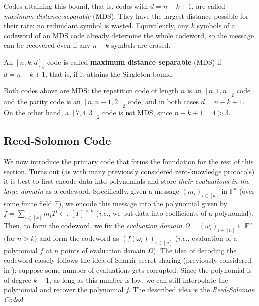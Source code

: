 \documentclass[../../book]{subfiles}
\begin{document}
Codes attaining this bound, that is, codes with $d = n-k+1$, are called \emph{maximum distance separable} (MDS).
They have the largest distance possible for their rate: no redundant symbol is wasted.
Equivalently, any $k$ symbols of a codeword of an MDS code already determine the whole codeword, so the message can be recovered even if any $n-k$ symbols are erased.

\begin{definition}\label{def:mds}
  An $[n,k,d]_q$ code is called \textbf{maximum distance separable} (MDS) if $d = n-k+1$, that is, if it attains the Singleton bound.
\end{definition}

\begin{example}
  Both codes above are MDS: the repetition code of length $n$ is an $[n,1,n]_2$ code and the parity code is an $[n,n-1,2]_2$ code, and in both cases $d = n-k+1$. On the other hand, a $[7,4,3]_2$ code is not MDS, since $n-k+1 = 4 > 3$.
\end{example}

\subsection{Reed-Solomon Code}

We now introduce the primary code that forms the foundation for the rest of this section.
Turns out (as with many previously considered zero-knowledge protocols) it is best to first encode data into polynomials and store \emph{their evaluations in the large domain} as a codeword.
Specifically, given a message $(m_i)_{i \in [k]}$ in $\mathbb{F}^k$ (over some finite field $\mathbb{F}$), we encode this message into the polynomial given by $f = \sum_{i \in [k]}m_iT^i \in \mathbb{F}[T]^{<k}$ (\emph{i.e.}, we put data into coefficients of a polynomial).
Then, to form the codeword, we fix the \emph{evaluation domain} $\Omega = (\omega_i)_{i \in [n]} \subseteq \mathbb{F}^n$ (for $n>k$) and form the codeword as $(f(\omega_i))_{i \in [n]}$ (\emph{i.e.}, evaluation of a polynomial $f$ at $n$ points of evaluation domain $\Omega$).
The idea of decoding the codeword closely follows the idea of Shamir secret sharing (previously considered in ): suppose some number of evaluations gets corrupted.
Since the polynomial is of degree $k-1$, as long as this number is low, we can still interpolate the polynomial and recover the polynomial $f$.
The described idea is the \emph{Reed-Solomon Codes}!
\end{document}
